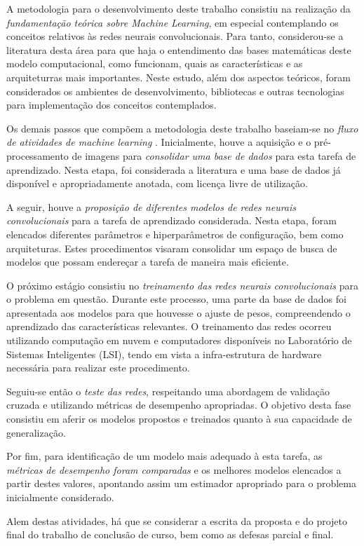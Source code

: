 A metodologia para o desenvolvimento deste trabalho consistiu na realização da \emph{fundamentação teórica sobre Machine Learning}, em especial contemplando os conceitos relativos às redes neurais convolucionais. Para tanto, considerou-se a literatura desta área para que haja o entendimento das bases matemáticas deste modelo computacional, como funcionam, quais as características e as arquiteturras mais importantes. Neste estudo, além dos aspectos teóricos, foram considerados os ambientes de desenvolvimento, bibliotecas e outras tecnologias para implementação dos conceitos contemplados.

Os demais passos que compõem a metodologia deste trabalho baseiam-se no \emph{fluxo de atividades de machine learning} \cite{marsland2015machine}. Inicialmente, houve a aquisição e o pré-processamento de imagens para \emph{consolidar uma base de dados} para esta tarefa de aprendizado. Nesta etapa, foi considerada a literatura e uma base de dados já disponível e apropriadamente anotada, com licença livre de utilização.

A seguir, houve a \emph{proposição de diferentes modelos de redes neurais convolucionais} para a tarefa de aprendizado considerada. Nesta etapa, foram elencados diferentes parâmetros e hiperparâmetros de configuração, bem como arquiteturas. Estes procedimentos visaram consolidar um espaço de busca de modelos que possam endereçar a tarefa de maneira mais eficiente.

O próximo estágio consistiu no \emph{treinamento das redes neurais convolucionais} para o problema em questão. Durante este processo, uma parte da base de dados foi apresentada aos modelos para que houvesse o ajuste de pesos, compreendendo o aprendizado das características relevantes. O treinamento das redes ocorreu utilizando computação em nuvem e computadores disponíveis no Laboratório de Sistemas Inteligentes (LSI), tendo em vista a infra-estrutura de hardware necessária para realizar este procedimento.

Seguiu-se então o \emph{teste das redes}, respeitando uma abordagem de validação cruzada e utilizando métricas de desempenho apropriadas. O objetivo desta fase consistiu em aferir os modelos propostos e treinados quanto à sua capacidade de generalização.

Por fim, para identificação de um modelo mais adequado à esta tarefa, as \emph{métricas de desempenho foram comparadas} e os melhores modelos elencados a partir destes valores, apontando assim um estimador apropriado para o problema inicialmente considerado.

Alem destas atividades, há que se considerar a escrita da proposta e do projeto final do trabalho de conclusão de curso, bem como as defesas parcial e final.

